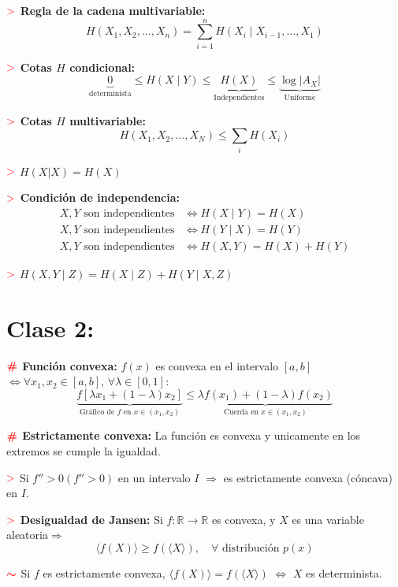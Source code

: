 \documentclass[%
 reprint,
 amsmath,amssymb,
 aps,
]{revtex4-1}
\begin{document}
\textbf{$\textcolor{red}{\mathbf{>}}$ Regla de la cadena multivariable: }
$$
H\left(X_{1}, X_{2}, \ldots, X_{n}\right)=\sum_{i=1}^{n} H\left(X_{i} \mid X_{i-1}, \ldots, X_{1}\right)
$$


\textbf{$\textcolor{red}{\mathbf{>}}$ Cotas $H$ condicional:}
$$
\underbrace{0}_{\text{determinista}} \leq H(X \mid Y) \leq \underbrace{H(X)}_{\text{Independientes}}
\leq \underbrace{\log|A_X|}_{\text{Uniforme}}
$$

\textbf{$\textcolor{red}{\mathbf{>}}$ Cotas $H$ multivariable:}
$$
H\left(X_{1}, X_{2}, \ldots, X_{N}\right) \leq \sum_{i} H\left(X_{i}\right)
$$

\textbf{$\textcolor{red}{\mathbf{>}}$} $H(X|X) = H(X)$

\textbf{$\textcolor{red}{\mathbf{>}}$ Condición de independencia:} 
$$
\begin{aligned}
  X, Y \text{ son independientes} & \Leftrightarrow H(X \mid Y)=H(X) \\
  X, Y \text{ son independientes} & \Leftrightarrow H(Y \mid X)=H(Y) \\
  X, Y \text{ son independientes} & \Leftrightarrow H(X, Y) = H(X)+H(Y)
\end{aligned}
$$

\textbf{$\textcolor{red}{\mathbf{>}}$} 
$H(X, Y \mid Z)=H(X \mid Z) + H(Y \mid X,Z)$

\section{Clase 2:}

\textbf{$\color{red}{\textbf{\#}}$ Función convexa:} 
$f(x)$ es convexa en el intervalo $[a, b]$ $\Leftrightarrow \forall x_{1}, x_{2} \in [a, b]$, $\forall \lambda \in[0,1]$:
$$
\underbrace{f\left[\lambda x_{1}+(1-\lambda) x_{2}\right]}_{\text {Gráfico de $f$ en } x \in (x_1,x_2)} \leq \underbrace{\lambda f\left(x_{1}\right)+(1-\lambda) f\left(x_{2}\right)}_{\text {Cuerda en } x \in (x_1,x_2)}
$$

\textbf{$\color{red}{\textbf{\#}}$ Estrictamente convexa:} 
La función es convexa y unicamente en los extremos se cumple la igualdad.

\textbf{$\textcolor{red}{\mathbf{>}}$} Si $f''>0(f''>0)$ en un intervalo $I$ $\Rightarrow$ es estrictamente convexa (cóncava) en $I$.

\textbf{$\textcolor{red}{\mathbf{>}}$ Desigualdad de Jansen:} 
Si $f: \mathbb{R} \rightarrow \mathbb{R}$ es convexa, y $X$ es una variable aleatoria$\Rightarrow$
$$
\langle f(X)\rangle \geq f(\langle X\rangle), \quad
\forall \text{ distribución } p(x)
$$

\textbf{$\textcolor{red}{\color{red}{\boldsymbol{\sim}}}$} 
Si $f$ es estrictamente convexa, $\langle f(X)\rangle = f(\langle X\rangle)$
$\Leftrightarrow$ $X$ es determinista.
\end{document}
